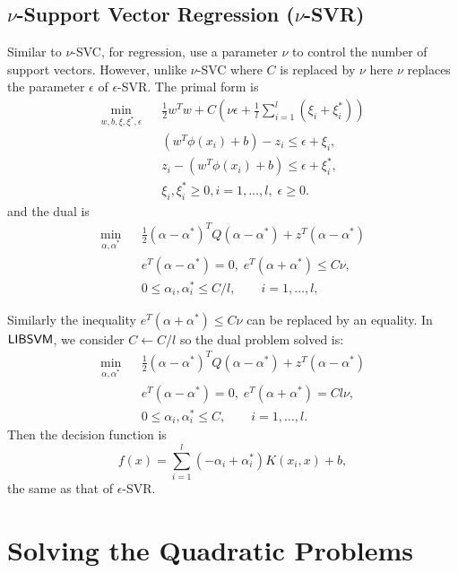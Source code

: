 \documentclass[11pt]{article}
\newcommand{\libsvm}{$\mbox{{\sf LIBSVM}}$}
\theoremstyle{break}
\begin{document}
\subsection{$\nu$-Support Vector Regression
($\nu$-SVR)}
Similar to $\nu$-SVC,
for regression,
use a parameter $\nu$ to control
the number of support vectors.
However, unlike $\nu$-SVC where 
$C$ is replaced by $\nu$
here $\nu$ replaces the parameter
$\epsilon$ of $\epsilon$-SVR.
The primal form is 
\begin{eqnarray}
 \min_{w,b,\xi,\xi^*,\epsilon} && \frac{1}{2} 
w^Tw 
+ C (\nu \epsilon 
+ \frac{1}{l} 
\sum_{i=1}^l (\xi_i + \xi^*_i))\label{primal1}  \\
&& (w^T \phi({x_i}) + b) - z_i 
\leq \epsilon  + \xi_i, 
\nonumber \\
&& z_i - (w^T \phi({x_i}) + b)
\leq \epsilon  + \xi^*_i,
\nonumber \\
&& \xi_i , \xi_i^* \geq 0, i = 1, \ldots, l, 
\; \epsilon \geq 0. \nonumber 
\end{eqnarray}
and the dual is
\begin{eqnarray}
\min_{\alpha,\alpha^*} && \frac{1}{2}
(\alpha-\alpha^*)^T 
Q (\alpha -\alpha^*) 
+ z^T (\alpha - \alpha^*) \nonumber  \\
&&  e^T(\alpha - \alpha^*) = 0, \;
 e^T (\alpha+\alpha^*) \leq C\nu,  \nonumber \\
&&0 \leq \alpha_i, \alpha^*_i \leq C/l, \qquad i = 1, \ldots, l,    \label{newsvmqp2}
\end{eqnarray}

Similarly the inequality 
$
 e^T (\alpha+\alpha^*) \leq C\nu$
can be replaced by an equality.
In \libsvm, we consider
$C \leftarrow C/l$ so the dual problem solved
is:
\begin{eqnarray}
 \min_{\alpha, \alpha^*} && \frac{1}{2}
(\alpha-\alpha^*)^T 
Q (\alpha -\alpha^*) 
+ z^T (\alpha - \alpha^*) \nonumber  \\
&&  e^T(\alpha - \alpha^*) = 0, \;
 e^T (\alpha+\alpha^*) = Cl\nu,  \nonumber \\
&&0 \leq \alpha_i, \alpha^*_i \leq C, \qquad i = 1, \ldots, l.    \label{nusvr}
\end{eqnarray}
Then the decision function is
\begin{equation*}
f(x) 
= \sum_{i=1}^l 
(-\alpha_i + \alpha_i^*) K(x_i,x)
+ b,
\end{equation*}
the same as that of $\epsilon$-SVR.

\section{Solving the Quadratic Problems}
\label{qp}
\end{document}
